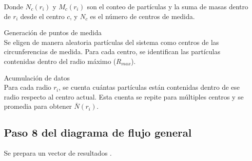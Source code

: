 	Donde $N_c(r_i)$ y $M_c(r_i)$ son el conteo de partículas y la suma de masas 
	dentro de $r_i$ desde el centro $c$, y $N_c$ es el número de centros de medida.

	 Generaci\'{o}n de puntos de medida\\
	Se eligen de manera aleatoria part\'{i}culas del sistema como centros de las circunferencias de medida. Para cada centro, se identifican las part\'{i}culas contenidas dentro del radio m\'{a}ximo (\(R_{max}\)).
	
	Acumulaci\'{o}n de datos\\
	Para cada radio \( r_i \), se cuenta cu\'{a}ntas part\'{i}culas est\'{a}n contenidas dentro de ese radio respecto al centro actual. Esta cuenta se repite para m\'{u}ltiples centros y se promedia para obtener \( \bar{N}(r_i) \).


 	
 	\subsection{Paso 8 del diagrama de flujo general}
 		
Se prepara un vector de resultados .
 
 
 	\clearpage
 

